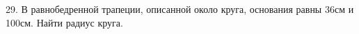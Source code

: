 29. В равнобедренной трапеции, описанной  около круга, основания равны 36см и 100см. Найти радиус круга.\\
